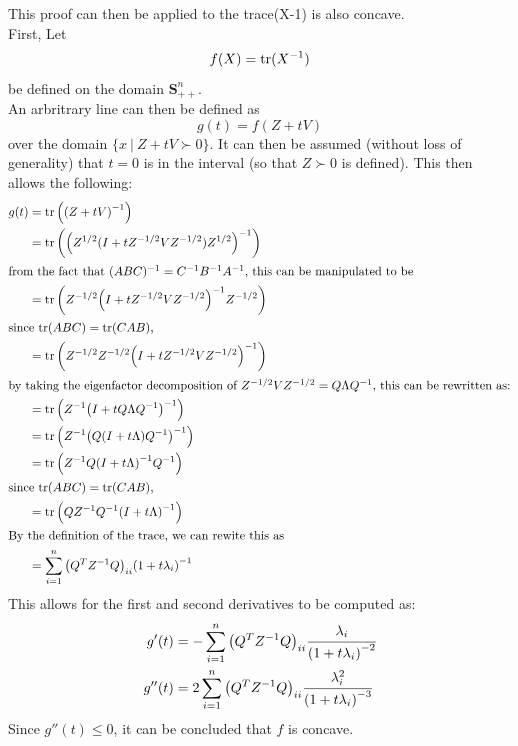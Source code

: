 \documentclass[letter]{article}
\begin{document}
This proof can then be applied to the trace(X{-1}) is also concave.\\
First, Let
\begin{equation}
	f(X) = \trace(X^{-1})
\end{equation}
be defined on the domain $\mathbf{S}_{++}^n$.\\
An arbritrary line can then be defined as
\begin{equation}
	g(t) = f(Z + tV)
\end{equation}
over the domain $\{x \ | \ Z + t V \succ 0\}$.
It can then be assumed (without loss of generality) that $t = 0$ is in the interval (so that $Z \succ 0$ is defined). This then allows the following:
\begin{align}
	g(t) &= \trace\qty(\qty(Z+tV)^{-1})\\
	&= \trace\qty(\qty(Z^{1/2} (I + t Z^{-1/2}V Z^{-1/2})Z^{1/2})^{-1})\\
	\intertext{from the fact that $(ABC)^{-1} = C^{-1}B^{-1}A^{-1}$, this can be manipulated to be}
	&= \trace\qty(Z^{-1/2} \qty(I + t Z^{-1/2}V Z^{-1/2})^{-1}Z^{-1/2})\\
	\intertext{since $\trace(ABC) = \trace(CAB)$,}
	&= \trace\qty(Z^{-1/2} Z^{-1/2} \qty(I + t Z^{-1/2} V Z^{-1/2})^{-1})\\
	\intertext{by taking the eigenfactor decomposition of $Z^{-1/2} V Z^{-1/2} = Q \Lambda Q^{-1}$, this can be rewritten as:}
	&= \trace\qty(Z^{-1} \qty(I + t Q \Lambda Q^{-1})^{-1})\\
	&= \trace\qty(Z^{-1} \qty(Q \qty( I + t \Lambda )Q^{-1})^{-1})\\
	&= \trace\qty(Z^{-1} Q \qty( I + t \Lambda)^{-1}Q^{-1})\\
	\intertext{since $\trace(ABC) = \trace(CAB)$,}
	&= \trace\qty(Q Z^{-1} Q^{-1}\qty( I + t \Lambda)^{-1})\\
	\intertext{By the definition of the trace, we can rewite this as}
	&= \sum_{i=1}^n \qty(Q^T Z^{-1} Q)_{ii} \qty(1 + t \lambda_i)^{-1}
\end{align}
This allows for the first and second derivatives to be computed as:
\begin{align}
	g'(t) &= -\sum_{i=1}^n \qty(Q^T Z^{-1} Q)_{ii} \cfrac{\lambda_i}{\qty(1 + t \lambda_i)^{-2}}\\
	g''(t) &= 2\sum_{i=1}^n \qty(Q^T Z^{-1} Q)_{ii} \cfrac{\lambda_i^2}{\qty(1 + t \lambda_i)^{-3}}
\end{align}
Since $g''(t) \leq 0$, it can be concluded that $f$ is concave.\\
\end{document}
